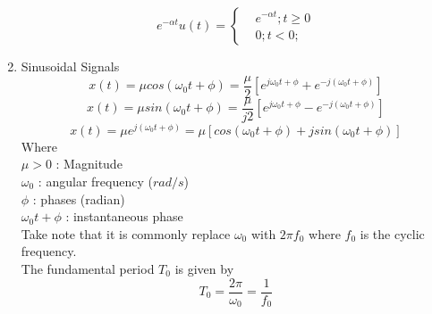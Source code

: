 \documentclass{article}
\begin{document}
\begin{enumerate}
\begin{equation}
        e^{-\alpha t}u(t) = 
        \begin{cases}
            & e^{-\alpha t} ; t \geq 0 \\
            & 0 ; t < 0 ;
        \end{cases}
    \end{equation}
    \item Sinusoidal Signals
    \begin{equation}
        x(t) = \mu cos(\omega_0t+\phi) = \frac{\mu}{2}[e^{j\omega_0t+\phi}+e^{-j(\omega_0t+\phi)}]
    \end{equation}
    \begin{equation}
        x(t) = \mu sin(\omega_0t+\phi) = \frac{\mu}{j2}[e^{j\omega_0t+\phi}-e^{-j(\omega_0t+\phi)}]
    \end{equation}
    \begin{equation}
        x(t) = \mu e^{j(\omega_0t+\phi)} = \mu[cos(\omega_0t+\phi) + jsin(\omega_0t+\phi)]
    \end{equation}
    Where \\
    $\mu > 0$ : Magnitude \\
    $\omega_0$ : angular frequency ($rad/s$)\\
    $\phi$ : phases (radian) \\
    $\omega_0t + \phi$ : instantaneous phase \\
    Take note that it is commonly replace $\omega_0$ with $2\pi f_0$ where $f_0$ is the cyclic frequency. \\
    The fundamental period $T_0$ is given by \[T_0 = \frac{2\pi}{\omega_0} = \frac{1}{f_0}\]
\end{enumerate}
\end{document}
